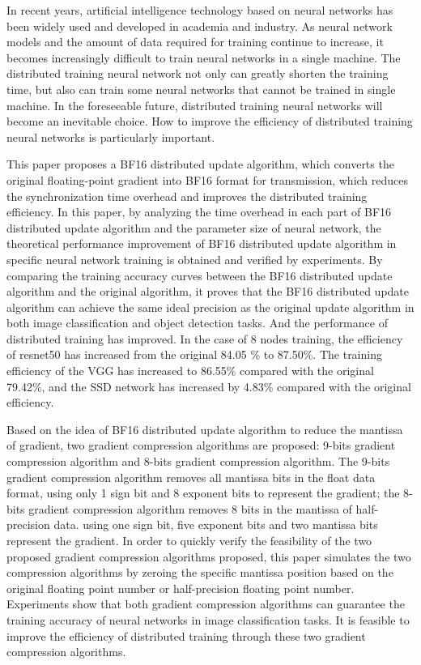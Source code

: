 \begin{eabstract}
In recent years, artificial intelligence technology based on neural networks has been widely used and developed in academia and industry. As neural network models and the amount of data required for training continue to increase, it becomes increasingly difficult to train neural networks in a single machine. The distributed training neural network not only can greatly shorten the training time, but also can train some neural networks that cannot be trained in single machine. In the foreseeable future, distributed training neural networks will become an inevitable choice. How to improve the efficiency of distributed training neural networks is particularly important.

This paper proposes a BF16 distributed update algorithm, which converts the original floating-point gradient into BF16 format for transmission, which reduces the synchronization time overhead and improves the distributed training efficiency. In this paper, by analyzing the time overhead in each part of BF16 distributed update algorithm and the parameter size of neural network, the theoretical performance improvement of BF16 distributed update algorithm in specific neural network training is obtained and verified by experiments. By comparing the training accuracy curves between the BF16 distributed update algorithm and the original algorithm, it proves that the BF16 distributed update algorithm can achieve the same ideal precision as the original update algorithm in both image classification and object detection tasks. And the performance of distributed training has improved. In the case of 8 nodes training, the efficiency of resnet50 has increased from the original 84.05 \% to 87.50\%. The training efficiency of the VGG has increased to 86.55\% compared with the original 79.42\%, and the SSD network has increased by 4.83\% compared with the original efficiency.

Based on the idea of ​​BF16 distributed update algorithm to reduce the mantissa of gradient, two gradient compression algorithms are proposed: 9-bits gradient compression algorithm and 8-bits gradient compression algorithm. The 9-bits gradient compression algorithm removes all mantissa bits in the float data format, using only 1 sign bit and 8 exponent bits to represent the gradient; the 8-bits gradient compression algorithm removes 8 bits in the mantissa of half-precision data. using one sign bit, five exponent bits and two mantissa bits represent the gradient. In order to quickly verify the feasibility of the two proposed gradient compression algorithms proposed, this paper simulates the two compression algorithms by zeroing the specific mantissa position based on the original floating point number or half-precision floating point number. Experiments show that both gradient compression algorithms can guarantee the training accuracy of neural networks in image classification tasks. It is feasible to improve the efficiency of distributed training through these two gradient compression algorithms.

\end{eabstract}

